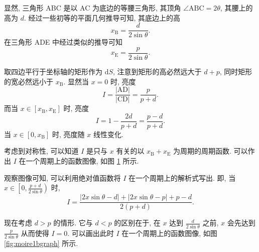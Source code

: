 \documentclass{article}
\begin{document}
显然, 三角形 ABC 是以 AC 为底边的等腰三角形, 其顶角 $\angle\mathrm{ABC}=2\theta$,
其腰上的高为 $d$.
经过一些初等的平面几何推导可知, 其底边上的高
\begin{equation}
	x_\mathrm B=\frac d{2\sin\theta}.
\end{equation}
在三角形 ADE 中经过类似的推导可知
\begin{equation}
	x_\mathrm E=\frac p{2\sin\theta}.
\end{equation}

取四边平行于坐标轴的矩形作为 $\mathrm dS$,
注意到矩形的高必然远大于 $d+p$,
同时矩形的宽必然远小于 $x_\mathrm B$.
显然当 $x=0$ 时, 亮度
\begin{equation}
	I=\frac{\left|\mathrm{AD}\right|}{\left|\mathrm{CD}\right|}
	=\frac p{p+d}.
\end{equation}
而当 $x\in\left[x_\mathrm B,x_\mathrm E\right]$ 时, 亮度
\begin{equation}
	I=1-\frac{2d}{p+d}=\frac{p-d}{p+d}.
\end{equation}
当 $x\in\left[0,x_\mathrm B\right]$ 时, 亮度随 $x$ 线性变化.

考虑到对称性, 可以知道 $I$ 是只与 $x$ 有关的以 $x_\mathrm B+x_\mathrm E$ 为周期的周期函数.
可以作出 $I$ 在一个周期上的函数图像, 如图 \ref{fig:moire1agraph} 所示.

\begin{figure}[h!]
	\centering
	\caption{}
	\label{fig:moire1agraph}
\end{figure}

观察图像可知, 可以利用绝对值函数将 $I$ 在一个周期上的解析式写出.
即, 当 $x\in\left[0,\frac{p+d}{2\sin\theta}\right)$ 时,
\begin{equation}
	\label{eq:moire1aI周期}
	I=\frac{\left|2x\sin\theta-d\right|+\left|2x\sin\theta-p\right|+p-d}
	{2\left(p+d\right)}.
\end{equation}

现在考虑 $d>p$ 的情形.
它与 $d<p$ 的区别在于, 在 $x$ 达到 $\frac d{2\sin\theta}$ 之前,
$x$ 会先达到 $\frac p{2\sin\theta}$ 从而使得 $I=0$.
可以画出此时 $I$ 在一个周期上的函数图像, 如图 \ref{fig:moire1bgraph} 所示.
\end{document}
